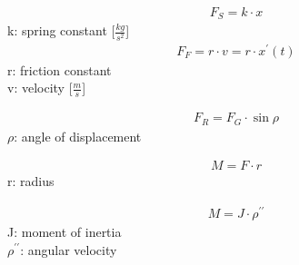 \begin{align}
F_S = k \cdot x
\end{align}
k: spring constant [$\frac{kg}{s^2}$]\\

\begin{align}
F_F = r \cdot v = r \cdot x^\prime(t)
\end{align}
r: friction constant \\
v: velocity [$\frac{m}{s}$]

\begin{align}
F_R = F_G \cdot \sin\rho
\end{align}
$\rho$: angle of displacement

\begin{align}
M = F \cdot r
\end{align}
r: radius

\begin{align}
M = J \cdot \rho^{\prime\prime}
\end{align}
J: moment of inertia \\
$\rho^{\prime\prime}$: angular velocity


